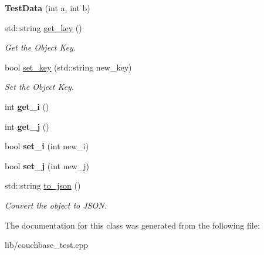 \begin{DoxyCompactItemize}
\item 
\hypertarget{classTestData_a0c1a967fc924de9ad0d2425bcf9cf93a}{{\bfseries Test\-Data} (int a, int b)}\label{classTestData_a0c1a967fc924de9ad0d2425bcf9cf93a}

\item 
\hypertarget{classTestData_ad2f1b4bd48d79f5c43de5dd1f4ab4c18}{std\-::string \hyperlink{classTestData_ad2f1b4bd48d79f5c43de5dd1f4ab4c18}{get\-\_\-key} ()}\label{classTestData_ad2f1b4bd48d79f5c43de5dd1f4ab4c18}

\begin{DoxyCompactList}\small\item\em Get the Object Key. \end{DoxyCompactList}\item 
\hypertarget{classTestData_a14b0a5b7927d7d9e4851cf9759cf4cd0}{bool \hyperlink{classTestData_a14b0a5b7927d7d9e4851cf9759cf4cd0}{set\-\_\-key} (std\-::string new\-\_\-key)}\label{classTestData_a14b0a5b7927d7d9e4851cf9759cf4cd0}

\begin{DoxyCompactList}\small\item\em Set the Object Key. \end{DoxyCompactList}\item 
\hypertarget{classTestData_a352589debffc0dcb6655925cf113f0f0}{int {\bfseries get\-\_\-i} ()}\label{classTestData_a352589debffc0dcb6655925cf113f0f0}

\item 
\hypertarget{classTestData_a73a6953388a5a1226bee055182868195}{int {\bfseries get\-\_\-j} ()}\label{classTestData_a73a6953388a5a1226bee055182868195}

\item 
\hypertarget{classTestData_ac47343ed6087d17cf51e0b801c7e25b9}{bool {\bfseries set\-\_\-i} (int new\-\_\-i)}\label{classTestData_ac47343ed6087d17cf51e0b801c7e25b9}

\item 
\hypertarget{classTestData_ad202385889cfdf06e5d0431f23646fae}{bool {\bfseries set\-\_\-j} (int new\-\_\-j)}\label{classTestData_ad202385889cfdf06e5d0431f23646fae}

\item 
\hypertarget{classTestData_af3a1f1f30aa0add7c008547c2417d48f}{std\-::string \hyperlink{classTestData_af3a1f1f30aa0add7c008547c2417d48f}{to\-\_\-json} ()}\label{classTestData_af3a1f1f30aa0add7c008547c2417d48f}

\begin{DoxyCompactList}\small\item\em Convert the object to J\-S\-O\-N. \end{DoxyCompactList}\end{DoxyCompactItemize}


The documentation for this class was generated from the following file\-:\begin{DoxyCompactItemize}
\item 
lib/couchbase\-\_\-test.\-cpp\end{DoxyCompactItemize}
